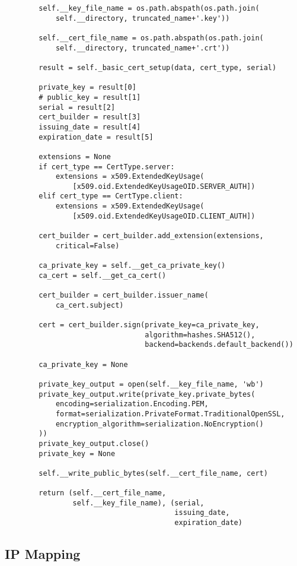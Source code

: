 \begin{verbatim}
        self.__key_file_name = os.path.abspath(os.path.join(
            self.__directory, truncated_name+'.key'))

        self.__cert_file_name = os.path.abspath(os.path.join(
            self.__directory, truncated_name+'.crt'))

        result = self._basic_cert_setup(data, cert_type, serial)

        private_key = result[0]
        # public_key = result[1]
        serial = result[2]
        cert_builder = result[3]
        issuing_date = result[4]
        expiration_date = result[5]

        extensions = None
        if cert_type == CertType.server:
            extensions = x509.ExtendedKeyUsage(
                [x509.oid.ExtendedKeyUsageOID.SERVER_AUTH])
        elif cert_type == CertType.client:
            extensions = x509.ExtendedKeyUsage(
                [x509.oid.ExtendedKeyUsageOID.CLIENT_AUTH])

        cert_builder = cert_builder.add_extension(extensions,
            critical=False)

        ca_private_key = self.__get_ca_private_key()
        ca_cert = self.__get_ca_cert()

        cert_builder = cert_builder.issuer_name(
            ca_cert.subject)

        cert = cert_builder.sign(private_key=ca_private_key,
                                 algorithm=hashes.SHA512(),
                                 backend=backends.default_backend())

        ca_private_key = None

        private_key_output = open(self.__key_file_name, 'wb')
        private_key_output.write(private_key.private_bytes(
            encoding=serialization.Encoding.PEM,
            format=serialization.PrivateFormat.TraditionalOpenSSL,
            encryption_algorithm=serialization.NoEncryption()
        ))
        private_key_output.close()
        private_key = None

        self.__write_public_bytes(self.__cert_file_name, cert)

        return (self.__cert_file_name,
                self.__key_file_name), (serial,
                                        issuing_date,
                                        expiration_date)
\end{verbatim}


\subsection{IP Mapping}

